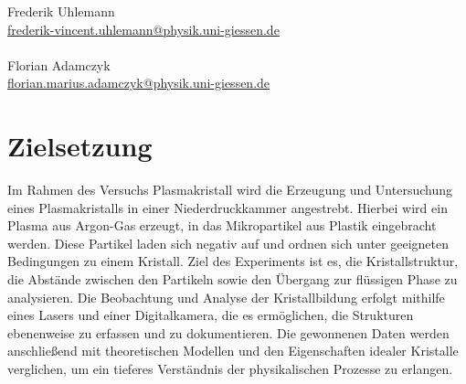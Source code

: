 \documentclass[12pt,a4paper,ngerman]{report}
\begin{document}
\begin{titlepage}
\begin{minipage}{0.49\textwidth}
\begin{flushright}
				\large{Frederik Uhlemann}\\
				\small{\href{mailto:frederik-vincent.uhlemann@physik.uni-giessen.de}{frederik-vincent.uhlemann@physik.uni-giessen.de}\\~\\
				}
				\large{Florian Adamczyk} \\
				\small{\href{mailto:florian.marius.adamczyk@physik.uni-giessen.de}{florian.marius.adamczyk@physik.uni-giessen.de}\\
			}
		\end{flushright}
	\end{minipage}
	
	\end{titlepage}
	
\setcounter{secnumdepth}{3}
\setcounter{tocdepth}{3}
\tableofcontents


	
\chapter*{Zielsetzung}
Im Rahmen des Versuchs \glqq{}Plasmakristall\grqq{} wird die Erzeugung und Untersuchung eines Plasmakristalls in einer Niederdruckkammer angestrebt. Hierbei wird ein Plasma aus Argon-Gas erzeugt, in das Mikropartikel aus Plastik eingebracht werden. Diese Partikel laden sich negativ auf und ordnen sich unter geeigneten Bedingungen zu einem Kristall. Ziel des Experiments ist es, die Kristallstruktur, die Abstände zwischen den Partikeln sowie den Übergang zur flüssigen Phase zu analysieren. Die Beobachtung und Analyse der Kristallbildung erfolgt mithilfe eines Lasers und einer Digitalkamera, die es ermöglichen, die Strukturen ebenenweise zu erfassen und zu dokumentieren. Die gewonnenen Daten werden anschließend mit theoretischen Modellen und den Eigenschaften idealer Kristalle verglichen, um ein tieferes Verständnis der physikalischen Prozesse zu erlangen.

\end{document}
